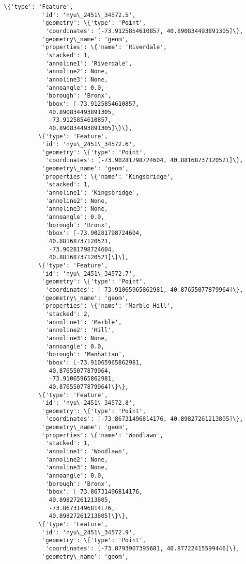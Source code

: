 \documentclass[11pt]{article}
\begin{document}
\begin{Verbatim}[commandchars=\\\{\}]
          \{'type': 'Feature',
           'id': 'nyu\_2451\_34572.5',
           'geometry': \{'type': 'Point',
            'coordinates': [-73.9125854610857, 40.890834493891305]\},
           'geometry\_name': 'geom',
           'properties': \{'name': 'Riverdale',
            'stacked': 1,
            'annoline1': 'Riverdale',
            'annoline2': None,
            'annoline3': None,
            'annoangle': 0.0,
            'borough': 'Bronx',
            'bbox': [-73.9125854610857,
             40.890834493891305,
             -73.9125854610857,
             40.890834493891305]\}\},
          \{'type': 'Feature',
           'id': 'nyu\_2451\_34572.6',
           'geometry': \{'type': 'Point',
            'coordinates': [-73.90281798724604, 40.88168737120521]\},
           'geometry\_name': 'geom',
           'properties': \{'name': 'Kingsbridge',
            'stacked': 1,
            'annoline1': 'Kingsbridge',
            'annoline2': None,
            'annoline3': None,
            'annoangle': 0.0,
            'borough': 'Bronx',
            'bbox': [-73.90281798724604,
             40.88168737120521,
             -73.90281798724604,
             40.88168737120521]\}\},
          \{'type': 'Feature',
           'id': 'nyu\_2451\_34572.7',
           'geometry': \{'type': 'Point',
            'coordinates': [-73.91065965862981, 40.87655077879964]\},
           'geometry\_name': 'geom',
           'properties': \{'name': 'Marble Hill',
            'stacked': 2,
            'annoline1': 'Marble',
            'annoline2': 'Hill',
            'annoline3': None,
            'annoangle': 0.0,
            'borough': 'Manhattan',
            'bbox': [-73.91065965862981,
             40.87655077879964,
             -73.91065965862981,
             40.87655077879964]\}\},
          \{'type': 'Feature',
           'id': 'nyu\_2451\_34572.8',
           'geometry': \{'type': 'Point',
            'coordinates': [-73.86731496814176, 40.89827261213805]\},
           'geometry\_name': 'geom',
           'properties': \{'name': 'Woodlawn',
            'stacked': 1,
            'annoline1': 'Woodlawn',
            'annoline2': None,
            'annoline3': None,
            'annoangle': 0.0,
            'borough': 'Bronx',
            'bbox': [-73.86731496814176,
             40.89827261213805,
             -73.86731496814176,
             40.89827261213805]\}\},
          \{'type': 'Feature',
           'id': 'nyu\_2451\_34572.9',
           'geometry': \{'type': 'Point',
            'coordinates': [-73.8793907395681, 40.87722415599446]\},
           'geometry\_name': 'geom',

\end{Verbatim}
\end{document}
